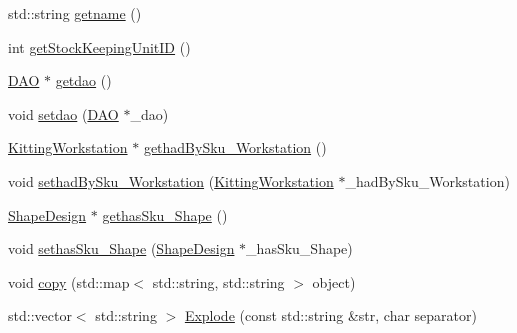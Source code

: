 \begin{DoxyCompactItemize}
std::string \hyperlink{class_stock_keeping_unit_aea522e6162d4639ab19ef0069f3336eb}{getname} ()
\item 
int \hyperlink{class_stock_keeping_unit_a8831730ada22b6a549834970c5907f92}{getStockKeepingUnitID} ()
\item 
\hyperlink{class_d_a_o}{DAO} $\ast$ \hyperlink{class_stock_keeping_unit_a118a016c0cb48facfa87eceeeaa75f68}{getdao} ()
\item 
void \hyperlink{class_stock_keeping_unit_abeffab863d6d7bc4cc59d547c82f3815}{setdao} (\hyperlink{class_d_a_o}{DAO} $\ast$\_\-dao)
\item 
\hyperlink{class_kitting_workstation}{KittingWorkstation} $\ast$ \hyperlink{class_stock_keeping_unit_a0b4ed9d0c129f532591cc9a2d9d00053}{gethadBySku\_\-Workstation} ()
\item 
void \hyperlink{class_stock_keeping_unit_afa7d069731e27fa60f71e09fa138b227}{sethadBySku\_\-Workstation} (\hyperlink{class_kitting_workstation}{KittingWorkstation} $\ast$\_\-hadBySku\_\-Workstation)
\item 
\hyperlink{class_shape_design}{ShapeDesign} $\ast$ \hyperlink{class_stock_keeping_unit_a69376e98f6de190dc65af0c2dfcceaaf}{gethasSku\_\-Shape} ()
\item 
void \hyperlink{class_stock_keeping_unit_a896acd502def57e981ba9e9973d19cd2}{sethasSku\_\-Shape} (\hyperlink{class_shape_design}{ShapeDesign} $\ast$\_\-hasSku\_\-Shape)
\item 
void \hyperlink{class_stock_keeping_unit_aa74663e5a79b178d3f0243e8e433ebd7}{copy} (std::map$<$ std::string, std::string $>$ object)
\item 
std::vector$<$ std::string $>$ \hyperlink{class_stock_keeping_unit_a402f5d392731853e069bc0526fddd5b9}{Explode} (const std::string \&str, char separator)
\end{DoxyCompactItemize}


